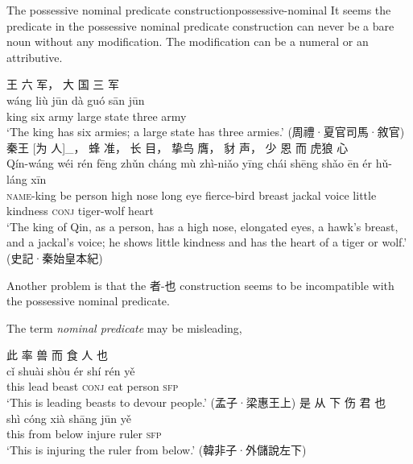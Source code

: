 \documentclass[UTF8, a4paper, oneside, scheme=plain, 12pt]{ctexrep}
\newcommand*{\term}[1]{\emph{#1}}
\newcommand{\translate}[1]{`#1'}
\newcommand*{\category}[1]{\textsc{#1}}
\begin{document}
\begin{todobox}{The possessive nominal predicate construction}{possessive-nominal}
    It seems the predicate in the possessive nominal predicate construction
    can never be a bare noun without any modification.
    The modification can be a numeral or an attributive.

    \begin{exe}
        \ex
        \glll 王 六 军， 大 国 三 军 \\
        wáng liù jūn dà guó sān jūn \\
        king six army large state three army \\
        \glt\translate{The king has six armies; a large state has three armies.} \hfill (周禮·夏官司馬·敘官)
        \ex
        \glll 秦王 [为 人]_{}， 蜂 准， 长 目， 挚鸟 膺， 豺 声， 少 恩 而 虎狼 心 \\
        Qín-wáng wéi rén fēng zhǔn cháng mù zhì-niǎo yīng chái shēng shǎo ēn ér hǔ-láng xīn \\
        \category{name}-king be person high nose long eye fierce-bird breast jackal voice little kindness \category{conj} tiger-wolf heart \\
        \glt\translate{The king of Qin, as a person, has a high nose, elongated eyes, a hawk's breast, and a jackal's voice; he shows little kindness and has the heart of a tiger or wolf.} \hfill (史記·秦始皇本紀)
    \end{exe}
    
    Another problem is that the 者-也 construction seems to be incompatible with the possessive nominal predicate.
\end{todobox}

The term \term{nominal predicate} may be misleading, 

\begin{exe}
    \ex
    \glll 此 率 兽 而 食 人 也 \\
    cǐ shuài shòu ér shí rén yě \\
    this lead beast \category{conj} eat person \category{sfp} \\
    \glt\translate{This is leading beasts to devour people.} \hfill (孟子·梁惠王上)
    \ex
    \glll 是 从 下 伤 君 也 \\
    shì cóng xià shāng jūn yě \\
    this from below injure ruler \category{sfp} \\
    \glt\translate{This is injuring the ruler from below.} \hfill (韓非子·外儲說左下)
\end{exe}
\end{document}
